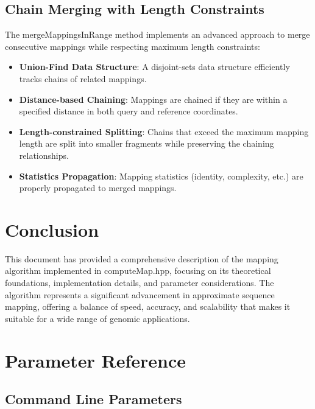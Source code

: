 \documentclass{article}
\begin{document}
\subsection{Chain Merging with Length Constraints}

The mergeMappingsInRange method implements an advanced approach to merge consecutive mappings while respecting maximum length constraints:

\begin{itemize}
    \item \textbf{Union-Find Data Structure}: A disjoint-sets data structure efficiently tracks chains of related mappings.
    
    \item \textbf{Distance-based Chaining}: Mappings are chained if they are within a specified distance in both query and reference coordinates.
    
    \item \textbf{Length-constrained Splitting}: Chains that exceed the maximum mapping length are split into smaller fragments while preserving the chaining relationships.
    
    \item \textbf{Statistics Propagation}: Mapping statistics (identity, complexity, etc.) are properly propagated to merged mappings.
\end{itemize}

\section{Conclusion}

This document has provided a comprehensive description of the mapping algorithm implemented in computeMap.hpp, focusing on its theoretical foundations, implementation details, and parameter considerations. The algorithm represents a significant advancement in approximate sequence mapping, offering a balance of speed, accuracy, and scalability that makes it suitable for a wide range of genomic applications.

\appendix
\section{Parameter Reference}

\subsection{Command Line Parameters}
\end{document}
